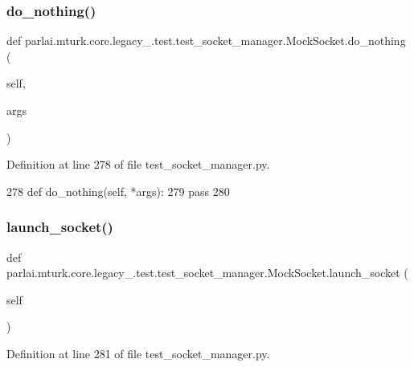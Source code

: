 \subsubsection{\texorpdfstring{do\+\_\+nothing()}{do\_nothing()}}
{\footnotesize\ttfamily def parlai.\+mturk.\+core.\+legacy\+\_.\+test.\+test\+\_\+socket\+\_\+manager.\+Mock\+Socket.\+do\+\_\+nothing (\begin{DoxyParamCaption}\item[{}]{self,  }\item[{}]{args }\end{DoxyParamCaption})}



Definition at line 278 of file test\+\_\+socket\+\_\+manager.\+py.


\begin{DoxyCode}
278     \textcolor{keyword}{def }do\_nothing(self, *args):
279         \textcolor{keywordflow}{pass}
280 
\end{DoxyCode}
\mbox{\label{classparlai_1_1mturk_1_1core_1_1legacy__2018_1_1test_1_1test__socket__manager_1_1MockSocket_a5a372676072282a22ab76b9480a4b937}} 
\subsubsection{\texorpdfstring{launch\+\_\+socket()}{launch\_socket()}}
{\footnotesize\ttfamily def parlai.\+mturk.\+core.\+legacy\+\_.\+test.\+test\+\_\+socket\+\_\+manager.\+Mock\+Socket.\+launch\+\_\+socket (\begin{DoxyParamCaption}\item[{}]{self }\end{DoxyParamCaption})}



Definition at line 281 of file test\+\_\+socket\+\_\+manager.\+py.



